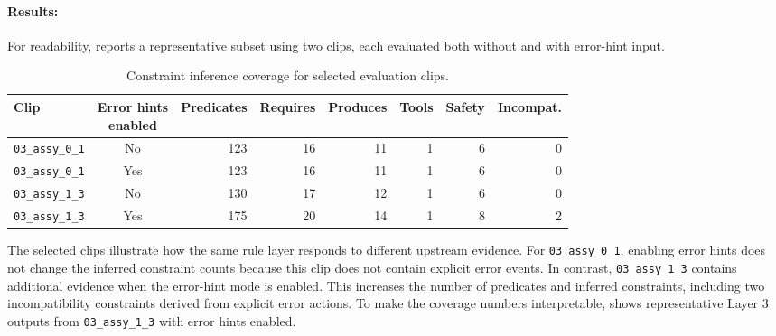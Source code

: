 \paragraph{Results:}
For readability,  reports a representative subset using
two clips, each evaluated both without and with error-hint input. 

\begin{table}[htbp]
\centering
\caption{Constraint inference coverage for selected evaluation clips.}
\label{tab:evaluation-constraint-coverage}
\small
\begin{tabular}{p{}crrrrrr}
\toprule
Clip & \makecell{Error hints\\enabled} & Predicates & Requires & Produces & Tools & Safety & Incompat. \\
\midrule
\texttt{03\_assy\_0\_1} & No  & 123 & 16 & 11 & 1 & 6 & 0 \\
\texttt{03\_assy\_0\_1} & Yes & 123 & 16 & 11 & 1 & 6 & 0 \\
\texttt{03\_assy\_1\_3} & No  & 130 & 17 & 12 & 1 & 6 & 0 \\
\texttt{03\_assy\_1\_3} & Yes & 175 & 20 & 14 & 1 & 8 & 2 \\
\bottomrule
\end{tabular}
\end{table}

The selected clips illustrate how the same rule layer responds to different upstream evidence. For \texttt{03\_assy\_0\_1}, enabling error hints does not change the inferred constraint counts because this clip does not contain explicit error events. In contrast, \texttt{03\_assy\_1\_3} contains additional evidence when the
error-hint mode is enabled. This increases the number of predicates and inferred
constraints, including two incompatibility constraints derived from explicit
error actions. To make the coverage numbers interpretable,  shows representative Layer 3 outputs from \texttt{03\_assy\_1\_3} with error hints
enabled. 

